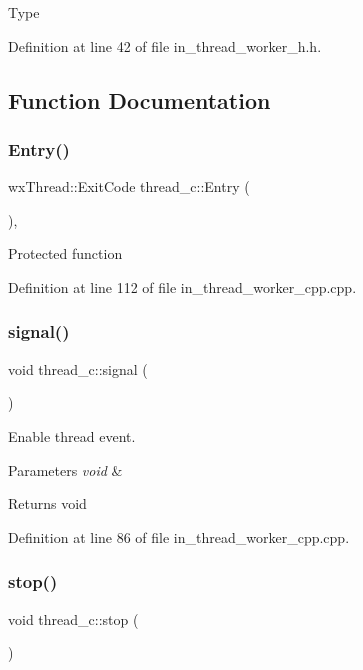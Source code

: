 Type 

Definition at line 42 of file in\+\_\+thread\+\_\+worker\+\_\+h.\+h.



\subsection{Function Documentation}
\mbox{\label{group___thread_gad1b9e83b42650d6a0d8cf9a9026f9494}} 
\subsubsection{Entry()}
{\footnotesize\ttfamily wx\+Thread\+::\+Exit\+Code thread\+\_\+c\+::\+Entry (\begin{DoxyParamCaption}{ }\end{DoxyParamCaption})\hspace{0.3cm}{\ttfamily [protected]}, {\ttfamily [virtual]}}

Protected function 

Definition at line 112 of file in\+\_\+thread\+\_\+worker\+\_\+cpp.\+cpp.

\mbox{\label{group___thread_ga8dc124dd9d42ae836c629110b5951d22}} 
\subsubsection{signal()}
{\footnotesize\ttfamily void thread\+\_\+c\+::signal (\begin{DoxyParamCaption}\item[{void}]{ }\end{DoxyParamCaption})}



Enable thread event. 


\begin{DoxyParams}{Parameters}
{\em void} & \\
\hline
\end{DoxyParams}
\begin{DoxyReturn}{Returns}
void 
\end{DoxyReturn}


Definition at line 86 of file in\+\_\+thread\+\_\+worker\+\_\+cpp.\+cpp.

\mbox{\label{group___thread_ga13da810e9320fb58d41c60089cce9bce}} 
\subsubsection{stop()}
{\footnotesize\ttfamily void thread\+\_\+c\+::stop (\begin{DoxyParamCaption}\item[{void}]{ }\end{DoxyParamCaption})}



